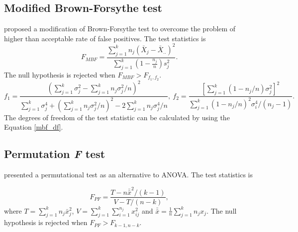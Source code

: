 \subsection{Modified Brown-Forsythe test}
\cite{mehrotra1997improving} proposed a modification of Brown-Forsythe test to overcome the problem of higher than acceptable rate of false positives.
The test statistics is
\begin{equation}
F_{MBF}=\frac{\displaystyle\sum\limits_{j=1}^kn_{j}(\bar{X}_{j}-\bar{X}_{..})^2}{\displaystyle\sum\limits_{j=1}^k (1-\frac{n_j}{n})s_j^2}.
\end{equation}
The null hypothesis is rejected when \begin{math}
F_{MBF}>F_{f_1,f_2} \end{math}.
\begin{equation}\label{mbf_df}
f_1=\frac{(\displaystyle\sum\limits_{j=1}^k \sigma_j^2-{\displaystyle\sum\limits_{j=1}^k n_j\sigma_j^2}/{n})^2}{\displaystyle\sum\limits_{j=1}^k \sigma_j^4+({\displaystyle\sum\limits_{j=1}^kn_j\sigma_j^2}/{n})^2-2{\displaystyle\sum\limits_{j=1}^kn_j\sigma_j^4}/{n}}, \
f_2=\frac{[\displaystyle\sum\limits_{j=1}^k (1-{n_j}/{n})\sigma_j^2]^2}{{\displaystyle\sum\limits_{j=1}^k {(1-{n_j}/{n})^2\sigma_i^4}/{(n_j-1)}}}.
\end{equation}
The degrees of freedom of the test statistic can be calculated by using the Equation \ref{mbf_df}.

\subsection{Permutation \textit{F} test}
\cite{berry2002fisher} presented a permutational test as an alternative to ANOVA. The test statistics is

\begin{equation}
F_{PF}=\frac{{T-n\bar{\bar{x}}^2}/{(k-1)}}{{V-T}/{(n-k)}},
\end{equation}
where \begin{math}  
T=\displaystyle\sum\limits_{j=1}^kn_j\bar{x}_j^2
\end{math}, 
\begin{math}
V=\displaystyle\sum\limits_{j=1}^k \displaystyle\sum\limits_{i=1}^{n_j} x_{ij}^2
\end{math} and \begin{math}
\bar{\bar{x}}=\frac 1 n \displaystyle\sum\limits_{j=1}^k n_jx_j \end{math}.
The null hypothesis is rejected when \begin{math} F_{PF}>F_{k-1, n-k} \end{math}.

